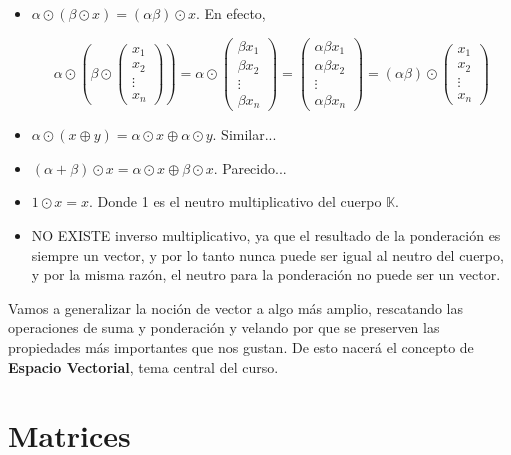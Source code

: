 \documentclass[12pt]{book}
\def\K{\mathbb{K}}
\begin{document}
\begin{itemize}
\item $\alpha\odot (\beta\odot  x)=(\alpha\beta)\odot  x$. En efecto,

  $$ \alpha\odot  \left(\beta\odot \left(\begin{array}{c}x_1\\ x_2\\ \vdots\\ x_n\end{array}\right)\right)
    =\alpha\odot \left(\begin{array}{c}\beta x_1\\\beta x_2\\ \vdots\\ \beta x_n\end{array}\right)
      =\left(\begin{array}{c}\alpha\beta x_1\\\alpha\beta x_2\\ \vdots\\\alpha \beta x_n\end{array}\right)
        =(\alpha\beta)\odot \left(\begin{array}{c}x_1\\ x_2\\ \vdots\\ x_n\end{array}\right)$$

\item $\alpha\odot (x\oplus y)=\alpha\odot  x \oplus \alpha\odot  y$. Similar...
\item $(\alpha+\beta)\odot  x=\alpha\odot  x\oplus \beta\odot  x$. Parecido...
\item $1\odot  x=x$. Donde 1 es el neutro multiplicativo del cuerpo $\K$.
\item NO EXISTE inverso multiplicativo, ya que el resultado de la ponderación es siempre un vector, y por lo tanto nunca puede ser igual al neutro del cuerpo, y por la misma razón, el neutro para la ponderación no puede ser un vector.
\end{itemize}

Vamos a generalizar la noción de vector a algo más amplio, rescatando las operaciones de suma y ponderación y velando por que se preserven las propiedades más importantes que nos gustan.
De esto nacerá el concepto de {\bf Espacio Vectorial}, tema central del curso.

\section{Matrices}
\end{document}
